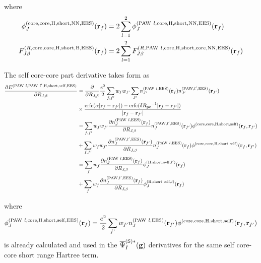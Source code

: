 \documentclass[paper=a4, fontsize=11pt]{article} %
\numberwithin{equation}{section} %
\numberwithin{figure}{section} %
\numberwithin{table}{section} %
\newcommand{\p}{\partial}
\newcommand{\bg}{{\bf{g}}}
\newcommand{\br}{{\bf{r}}}
\newcommand{\rS}{{\mathrm{S}}}
\newcommand{\rEES}{{\mathrm{EES}}}
\newcommand{\rcore}{{\mathrm{core}}}
\newcommand{\rNN}{{\mathrm{NN}}}
\newcommand{\rself}{{\mathrm{self}}}
\newcommand{\rshort}{{\mathrm{short}}}
\newcommand{\rerfc}{{\mathrm{erfc}}}
\newcommand{\rP}{{\mathrm{PAW}}}
\newcommand{\rH}{{\mathrm{H}}}
\newcommand{\rB}{{\mathrm{B}}}
\newcommand{\psigsc}{{\overline \Psi_I^{(\rS)*}(\bg)}}
\newcommand{\RJb}{{R_{J,\beta}}}
\newcommand{\Rpc}{{R_{\mathrm{pc}}}}
\begin{document}
where
\begin{equation}
\begin{split}
\phi_J^{(\rcore,\rcore,\rH,\rshort,\rNN,\rEES)}(\br_f)&= 2\sum_{l=1}^2\phi_J^{(\rP\ l,\rcore,\rH,\rshort,\rNN,\rEES)}(\br_f)\\
F_{J\beta}^{(R,\rcore,\rcore,\rH,\rshort,\rB,\rEES)}(\br_f)&= 2\sum_{l=1}^2F_{J\beta}^{(R,\rP\ l,\rcore,\rH,\rshort,\rcore,\rNN,\rEES)}(\br_f)
\end{split}
\end{equation}



The self core-core part derivative takes form as
\begin{equation}
\begin{split}
\frac{\p E^{(\rP\ l,\rP\ l',\rH,\rshort,\rself,\rEES)}}{\p \RJb}
&= \frac{\p }{\p \RJb} \frac{e^2}{2}\sum_{f,f'} w_f w_{f'} \sum_{J'} n_{J'}^{(\rP\ l,\rEES)}(\br_f) n_{J'}^{(\rP,l',\rEES)}(\br_{f'})\\
&\times \frac{\rerfc(\alpha|\br_f-\br_{f'}|)-\rerfc(\delta \Rpc^{-1}|\br_f-\br_{f'}|)}{|\br_f-\br_{f'}|}\\
&= \sum_{f,f'} w_f w_{f'} \frac{\p n_J^{(\rP\ l,\rEES)}(\br_f) }{\p \RJb}n_J^{(\rP,l',\rEES)}(\br_{f'})\phi^{(\rcore,\rcore,\rH,\rshort,\rself)}(\br_f,\br_{f'}) \\
&+ \sum_{f,f'} w_f w_{f'} \frac{\p n_J^{(\rP,l',\rEES)}(\br_{f'}) }{\p \RJb}n_J^{(\rP\ l,\rEES)}(\br_{f})\phi^{(\rcore,\rcore,\rH,\rshort,\rself)}(\br_f,\br_{f'}) \\
&= \sum_{f} w_f \frac{\p n_J^{(\rP\ l,\rEES)}(\br_f) }{\p \RJb}\phi_J^{(\rH,\rshort,\rself,l')}(\br_f) \\
&+ \sum_{f} w_f \frac{\p n_J^{(\rP,l',\rEES)}(\br_f) }{\p \RJb}\phi_J^{(\rH,\rshort,\rself,l)}(\br_f) \\
\end{split}
\end{equation}

where
\begin{equation}
\begin{split}
\phi_J^{(\rP\ l,\rcore,\rH,\rshort,\rself,\rEES)}(\br_f) & = \frac{e^2}{2}\sum_{f'} w_{f'} n_J^{(\rP\ l,\rEES)}(\br_{f'})\phi^{(\rcore,\rcore,\rH,\rshort,\rself)}(\br_f,\br_{f'}) \\
\end{split}
\end{equation}
is already calculated and used in the $\psigsc$ derivatives for the same self core-core short range Hartree term.
\end{document}
